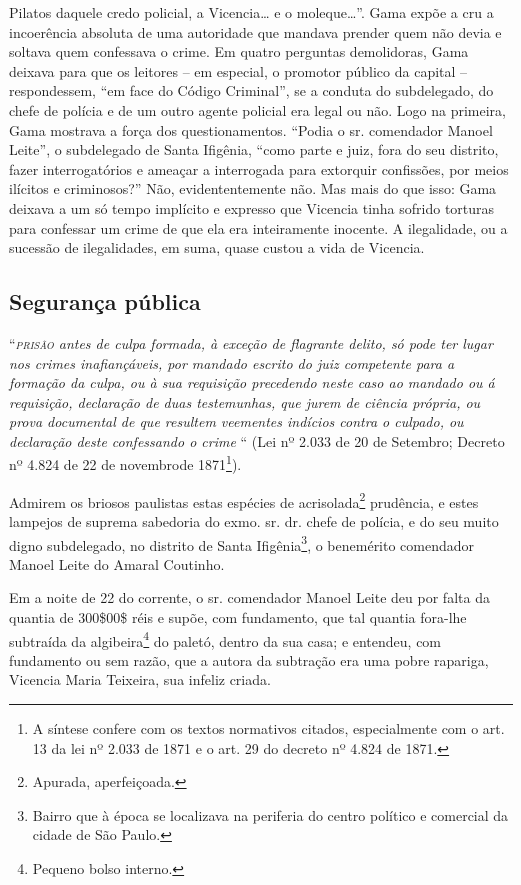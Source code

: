 \begin{didascalia}
{Pilatos daquele credo policial, a Vicencia\ldots{} e o moleque\ldots{}''. Gama
expõe a cru a incoerência absoluta de uma autoridade que mandava prender
quem não devia e soltava quem confessava o crime. Em quatro perguntas
demolidoras, Gama deixava para que os leitores -- em especial, o
promotor público da capital -- respondessem, ``em face do Código
Criminal'', se a conduta do subdelegado, do chefe de polícia e de um
outro agente policial era legal ou não. Logo na primeira, Gama mostrava
a força dos questionamentos. ``Podia o sr. comendador Manoel Leite'', o
subdelegado de Santa Ifigênia, ``como parte e juiz, fora do seu distrito,
fazer interrogatórios e ameaçar a interrogada para extorquir confissões,
por meios ilícitos e criminosos?'' Não, evidententemente não. Mas mais do
que isso: Gama deixava a um só tempo implícito e expresso que Vicencia
tinha sofrido torturas para confessar um crime de que ela era
inteiramente inocente. A ilegalidade, ou a sucessão de ilegalidades, em
suma, quase custou a vida de Vicencia.}
\end{didascalia}

\subsection{Segurança pública}

``\emph{\textsc{prisão} antes de culpa formada, à exceção de flagrante delito, só
pode ter lugar nos crimes inafiançáveis, por mandado escrito do juiz
competente para a formação da culpa, ou à sua requisição precedendo
neste caso ao mandado ou á requisição, declaração de duas testemunhas,
que jurem de ciência própria, ou prova documental de que resultem
veementes indícios contra o culpado, ou declaração deste confessando o
crime} `` (Lei nº 2.033 de 20 de Setembro; Decreto nº 4.824 de 22 de
novembrode 1871\footnote{ A síntese confere com os textos normativos
  citados, especialmente com o art. 13 da lei nº 2.033 de 1871 e o art.
  29 do decreto nº 4.824 de 1871.}).

Admirem os briosos paulistas estas espécies de acrisolada\footnote{
  Apurada, aperfeiçoada.} prudência, e estes lampejos de suprema
sabedoria do exmo. sr. dr. chefe de polícia, e do seu muito digno
subdelegado, no distrito de Santa Ifigênia\footnote{ Bairro que à época
  se localizava na periferia do centro político e comercial da cidade de
  São Paulo.}, o benemérito comendador Manoel Leite do Amaral Coutinho.

Em a noite de 22 do corrente, o sr. comendador Manoel Leite deu por
falta da quantia de 300\$00\$ réis e supõe, com fundamento, que tal
quantia fora-lhe subtraída da algibeira\footnote{ Pequeno bolso
  interno.} do paletó, dentro da sua casa; e entendeu, com fundamento ou
sem razão, que a autora da subtração era uma pobre rapariga, Vicencia
Maria Teixeira, sua infeliz criada.

